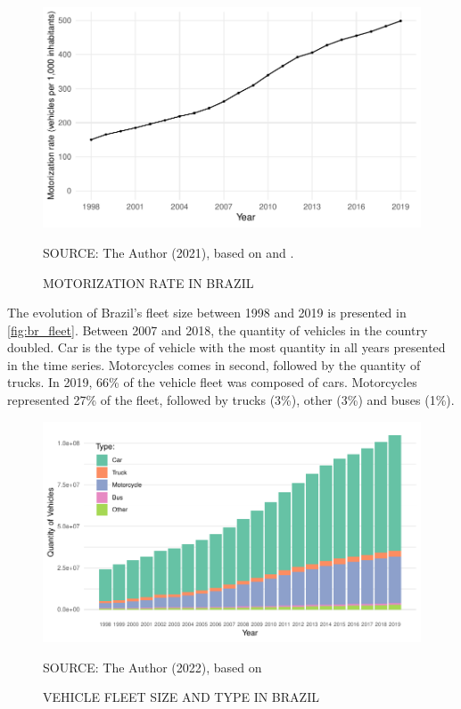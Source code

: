 
\begin{figure}[!htbp]
    \centering\footnotesize
    \captionsetup{font=footnotesize}
    \caption{MOTORIZATION RATE IN BRAZIL}
    \includegraphics{fig/brazil_motor.pdf}
    \label{fig:br_motor}
    \par SOURCE: The Author (2021), based on \textcite{MinistryofHealth2021} and \textcite{DENATRAN2020}.
\end{figure} 

The evolution of Brazil's fleet size between 1998 and 2019 is presented in \autoref{fig:br_fleet}. Between 2007 and 2018, the quantity of vehicles in the country doubled. Car is the type of vehicle with the most quantity in all years presented in the time series. Motorcycles comes in second, followed by the quantity of trucks. In 2019, 66\% of the vehicle fleet was composed of cars. Motorcycles represented 27\% of the fleet, followed by trucks (3\%), other (3\%) and buses (1\%). 

\begin{figure}[!htbp]
    \centering\footnotesize
    \captionsetup{font=footnotesize}
    \caption{VEHICLE FLEET SIZE AND TYPE IN BRAZIL}
    \includegraphics{fig/brazil_fleet_type.pdf}
    \label{fig:br_fleet}
    \par SOURCE: The Author (2022), based on \textcite{DENATRAN2020}
\end{figure}

